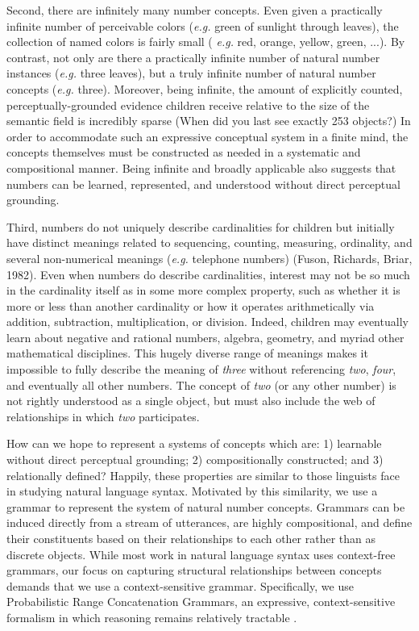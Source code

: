 \documentclass[10pt,letterpaper]{article}
\begin{document}
Second, there are infinitely many number concepts. Even given a
practically infinite number of perceivable colors ({\it e.g.}
green of sunlight through leaves), the collection of named colors is fairly small ({\it
  e.g.} red, orange, yellow, green, ...). By contrast, not only are there
a practically infinite number of natural number instances ({\it e.g.}
three leaves), but a truly infinite number of natural number concepts
({\it e.g.} three). Moreover, being infinite, the amount of explicitly
counted, perceptually-grounded evidence children receive relative to
the size of the semantic field is incredibly sparse (When did you last
see exactly 253 objects?) In order to accommodate such an expressive
conceptual system in a finite mind, the concepts themselves must be
constructed as needed in a systematic and compositional manner.
Being infinite and broadly applicable also suggests that numbers can
be learned, represented, and understood without direct perceptual
grounding.

Third, numbers do not uniquely describe cardinalities for children but
initially have distinct meanings related to sequencing, counting,
measuring, ordinality, and several non-numerical meanings ({\it e.g.}
telephone numbers) (Fuson, Richards, Briar, 1982). Even when numbers
do describe cardinalities, interest may not be so much in the
cardinality itself as in some more complex property, such as whether
it is more or less than another cardinality or how it operates
arithmetically via addition, subtraction, multiplication, or division.
Indeed, children may eventually learn about negative and rational
numbers, algebra, geometry, and myriad other mathematical disciplines.
This hugely diverse range of meanings makes it impossible to fully
describe the meaning of \emph{three} without referencing \emph{two},
\emph{four}, and eventually all other numbers. The concept of
\emph{two} (or any other number) is not rightly understood as a single
object, but must also include the web of relationships in which
\emph{two} participates.

How can we hope to represent a systems of concepts which are: 1)
learnable without direct perceptual grounding; 2) compositionally
constructed; and 3) relationally defined? Happily, these properties
are similar to those linguists face in studying natural language
syntax. Motivated by this similarity, we use a grammar to represent
the system of natural number concepts. Grammars can be induced
directly from a stream of utterances, are highly compositional, and
define their constituents based on their relationships to each other
rather than as discrete objects. While most work in natural language
syntax uses context-free grammars, our focus on capturing structural
relationships between concepts demands that we use a context-sensitive
grammar. Specifically, we use Probabilistic Range Concatenation
Grammars, an expressive, context-sensitive formalism in which
reasoning remains relatively tractable \citep{boullier2005range}.
\end{document}
